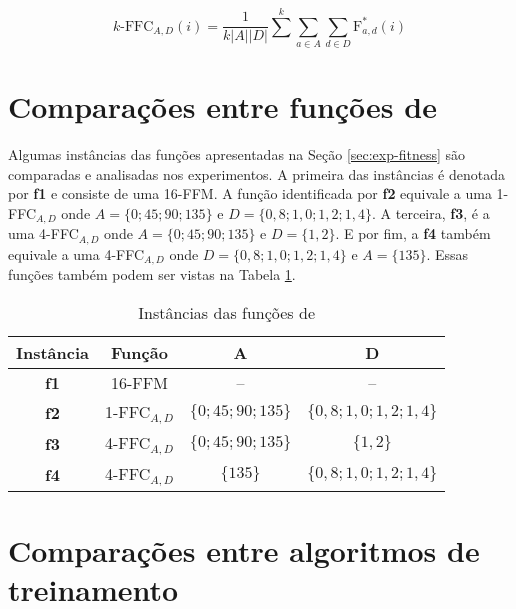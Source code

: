\begin{equation}
\label{eq:ffc}
k\text{-FFC}_{A,D} (i) = \frac{1}{k |A| |D|} \sum^{k} \sum_{a \in A} \sum_{d \in D} \text{F}_{a,d}^{*} (i)
\end{equation}


\section{Comparações entre funções de \fitness}
\label{sec:exp-comp-fitness}

Algumas instâncias das funções apresentadas na Seção \ref{sec:exp-fitness} são comparadas e analisadas nos experimentos. A primeira das instâncias é denotada por \textbf{f1} e consiste de uma 16-FFM. A função identificada por \textbf{f2} equivale a uma 1-FFC$_{A,D}$ onde $A = \{0; 45; 90; 135\}$ e $D = \{0,8; 1,0; 1,2; 1,4\}$. A terceira, \textbf{f3}, é a uma 4-FFC$_{A,D}$ onde $A = \{0; 45; 90; 135\}$ e $D = \{1,2\}$. E por fim, a \textbf{f4} também equivale a uma 4-FFC$_{A,D}$ onde $D = \{0,8; 1,0; 1,2; 1,4\}$ e $A = \{135\}$. Essas funções também podem ser vistas na Tabela \ref{tab:fitness-functions}.

\begin{table}[H]
    \centering
    \begin{tabular}{| c | c | c | c |}
        \hline
        Instância & Função & A & D \\ \hline
        \textbf{f1} & 16-FFM & -- & -- \\ \hline
        \textbf{f2} & 1-FFC$_{A,D}$ & $\{0; 45; 90; 135\}$ & $\{0,8; 1,0; 1,2; 1,4\}$ \\ \hline
        \textbf{f3} & 4-FFC$_{A,D}$ & $\{0; 45; 90; 135\}$ & $\{1,2\}$ \\ \hline
        \textbf{f4} & 4-FFC$_{A,D}$ & $\{135\}$ & $\{0,8; 1,0; 1,2; 1,4\}$ \\ \hline
    \end{tabular}
    \caption{Instâncias das funções de \fitness}
    \label{tab:fitness-functions}
\end{table}


\section{Comparações entre algoritmos de treinamento}
\label{sec:exp-comp-algorithms}

